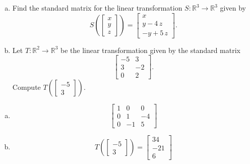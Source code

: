 
\begin{exerciseStatement}

\begin{enumerate}[(a)]
\item Find the standard matrix for the linear transformation \(S:\mathbb{R}^ 3  \to \mathbb{R}^ 3 \) given by \[S\left(  \left[\begin{array}{c}
x \\
y \\
z
\end{array}\right]  \right) =  \left[\begin{array}{c}
x \\
y - 4 \, z \\
-y + 5 \, z
\end{array}\right] .\]
\item Let \(T:\mathbb{R}^ 2  \to \mathbb{R}^ 3 \) be the linear transformation given by the standard matrix \[ \left[\begin{array}{cc}
-5 & 3 \\
3 & -2 \\
0 & 2
\end{array}\right] .\] Compute \(T\left( \left[\begin{array}{c}
-5 \\
3
\end{array}\right]  \right)\). 
\end{enumerate}
    
\end{exerciseStatement}
    
\begin{exerciseAnswer} 

\begin{enumerate}[(a)]
\item \[ \left[\begin{array}{ccc}
1 & 0 & 0 \\
0 & 1 & -4 \\
0 & -1 & 5
\end{array}\right] \]
\item \[T\left( \left[\begin{array}{c}
-5 \\
3
\end{array}\right]  \right)= \left[\begin{array}{c}
34 \\
-21 \\
6
\end{array}\right] \]
\end{enumerate}
    
\end{exerciseAnswer}
    
